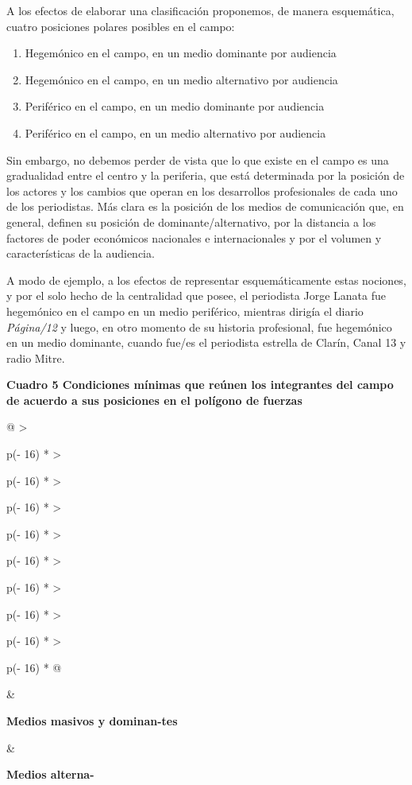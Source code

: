 {A los efectos de elaborar una clasificación proponemos, de manera esquemática, cuatro posiciones polares posibles en el campo:

\begin{enumerate}
\def\labelenumi{\arabic{enumi})}
\item
  Hegemónico en el campo, en un medio dominante por audiencia
\item
  Hegemónico en el campo, en un medio alternativo por audiencia
\item
  Periférico en el campo, en un medio dominante por audiencia
\item
  Periférico en el campo, en un medio alternativo por audiencia
\end{enumerate}

Sin embargo, no debemos perder de vista que lo que existe en el campo es una gradualidad entre el centro y la periferia, que está determinada por la posición de los actores y los cambios que operan en los desarrollos profesionales de cada uno de los periodistas. Más clara es la posición de los medios de comunicación que, en general, definen su posición de dominante/alternativo, por la distancia a los factores de poder económicos nacionales e internacionales y por el volumen y características de la audiencia.

A modo de ejemplo, a los efectos de representar esquemáticamente estas nociones, y por el solo hecho de la centralidad que posee, el periodista Jorge Lanata fue hegemónico en el campo en un medio periférico, mientras dirigía el diario \emph{Página/12} y luego, en otro momento de su historia profesional, fue hegemónico en un medio dominante, cuando fue/es el periodista estrella de Clarín, Canal 13 y radio Mitre.

\textbf{Cuadro 5 Condiciones mínimas que reúnen los integrantes del campo de acuerdo a sus posiciones en el polígono de fuerzas}

\begin{longtable}[]{@{}
  >{\raggedright\arraybackslash}p{(\columnwidth - 16\tabcolsep) * }
  >{\raggedright\arraybackslash}p{(\columnwidth - 16\tabcolsep) * }
  >{\raggedright\arraybackslash}p{(\columnwidth - 16\tabcolsep) * }
  >{\raggedright\arraybackslash}p{(\columnwidth - 16\tabcolsep) * }
  >{\raggedright\arraybackslash}p{(\columnwidth - 16\tabcolsep) * }
  >{\raggedright\arraybackslash}p{(\columnwidth - 16\tabcolsep) * }
  >{\raggedright\arraybackslash}p{(\columnwidth - 16\tabcolsep) * }
  >{\raggedright\arraybackslash}p{(\columnwidth - 16\tabcolsep) * }
  >{\raggedright\arraybackslash}p{(\columnwidth - 16\tabcolsep) * }@{}}
\toprule\noalign{}
\begin{minipage}[b]{\linewidth}\raggedright
\end{minipage} & \begin{minipage}[b]{\linewidth}\raggedright
\textbf{Medios masivos y dominan-tes}
\end{minipage} & \begin{minipage}[b]{\linewidth}\raggedright
\textbf{Medios alterna-}


\end{minipage}
\end{longtable}}
